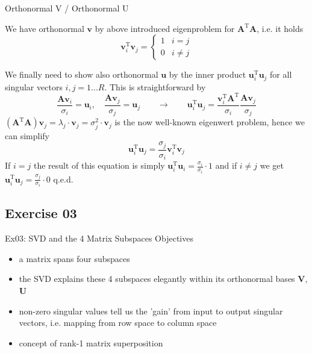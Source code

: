 \documentclass[mathserif, aspectratio=1610]{intbeamer}
\begin{document}
\begin{frame}{Orthonormal V / Orthonormal U}

We have orthonormal $\bm{v}$ by above introduced eigenproblem for $\bm{A}^\mathrm{T} \bm{A}$, i.e. it holds
$$
\bm{v}^\mathrm{T}_i \bm{v}_j =
\begin{cases}
1& i = j\\
0& i\neq j
\end{cases}
$$

We finally need to show also orthonormal $\bm{u}$ by the inner product $\bm{u}^\mathrm{T}_i \bm{u}_j$ for all singular vectors $i,j=1...R$. This is
straightforward by
$$\frac{\bm{A} \bm{v}_i}{\sigma_i} = \bm{u}_i, \quad
\frac{\bm{A} \bm{v}_j}{\sigma_j} = \bm{u}_j
\qquad\rightarrow\qquad
\bm{u}^\mathrm{T}_i \bm{u}_j =
\frac{\bm{v}^\mathrm{T}_i \bm{A}^\mathrm{T}}{\sigma_i}
\frac{\bm{A} \bm{v}_j}{\sigma_j}
$$
$(\bm{A}^\mathrm{T}\bm{A}) \bm{v}_j = \lambda_j \cdot \bm{v}_j = \sigma_j^2 \cdot \bm{v}_j $ is the now well-known eigenwert problem, hence we can simplify
$$\bm{u}^\mathrm{T}_i \bm{u}_j =
\frac{\sigma_j}{\sigma_i} \bm{v}^\mathrm{T}_i \bm{v}_j
$$
If $i=j$ the result of this equation is simply $\bm{u}^\mathrm{T}_i \bm{u}_i= \frac{\sigma_i}{\sigma_i} \cdot 1$ and if $i \neq j$ we get
$\bm{u}^\mathrm{T}_i \bm{u}_j=\frac{\sigma_j}{\sigma_i} \cdot 0$
q.e.d.


\end{frame}
























\subsection{Exercise 03}
\begin{frame}{Ex03: SVD and the 4 Matrix Subspaces}
Objectives
\begin{itemize}
\item a matrix spans four subspaces
\item the SVD explains these 4 subspaces elegantly within its orthonormal bases $\bm{V}$, $\bm{U}$
\item non-zero singular values tell us the 'gain' from input to output singular vectors, i.e. mapping from row space to column space
\item concept of rank-1 matrix superposition
\end{itemize}
\end{frame}
\end{document}
